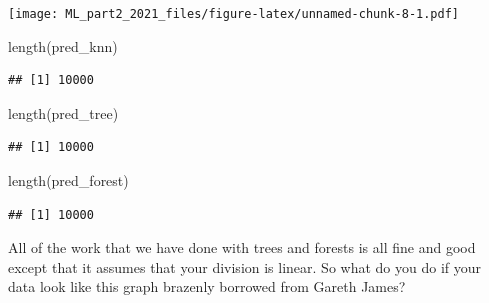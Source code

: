 \documentclass[
]{article}
\newenvironment{Shaded}{\begin{snugshade}}{\end{snugshade}}
\newcommand{\FunctionTok}[1]{\textcolor[rgb]{0.00,0.00,0.00}{#1}}
\newcommand{\NormalTok}[1]{#1}
\begin{document}
\texttt{[image: ML\_part2\_2021\_files/figure-latex/unnamed-chunk-8-1.pdf]}

\begin{Shaded}
\begin{Highlighting}[]
\FunctionTok{length}\NormalTok{(pred\_knn)}
\end{Highlighting}
\end{Shaded}

\begin{verbatim}
## [1] 10000
\end{verbatim}

\begin{Shaded}
\begin{Highlighting}[]
\FunctionTok{length}\NormalTok{(pred\_tree)}
\end{Highlighting}
\end{Shaded}

\begin{verbatim}
## [1] 10000
\end{verbatim}

\begin{Shaded}
\begin{Highlighting}[]
\FunctionTok{length}\NormalTok{(pred\_forest)}
\end{Highlighting}
\end{Shaded}

\begin{verbatim}
## [1] 10000
\end{verbatim}

All of the work that we have done with trees and forests is all fine and
good except that it assumes that your division is linear. So what do you
do if your data look like this graph brazenly borrowed from Gareth
James?
\end{document}

